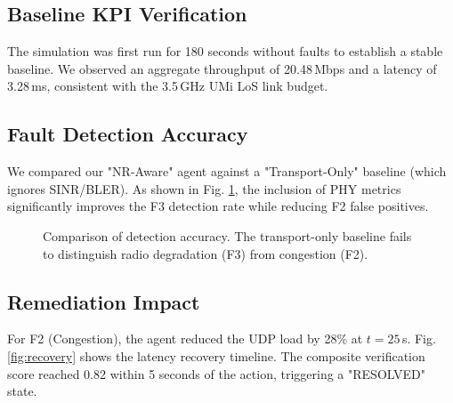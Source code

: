 \documentclass[journal]{IEEEtran}
\begin{document}
\subsection{Baseline KPI Verification}
The simulation was first run for 180 seconds without faults to establish a stable baseline. We observed an aggregate throughput of 20.48\,Mbps and a latency of 3.28\,ms, consistent with the 3.5\,GHz UMi LoS link budget.

\subsection{Fault Detection Accuracy}
We compared our "NR-Aware" agent against a "Transport-Only" baseline (which ignores SINR/BLER). As shown in Fig. \ref{fig:accuracy}, the inclusion of PHY metrics significantly improves the F3 detection rate while reducing F2 false positives.

\begin{figure}[htbp]
\centering
{}
\caption{Comparison of detection accuracy. The transport-only baseline fails to distinguish radio degradation (F3) from congestion (F2).}
\label{fig:accuracy}
\end{figure}

\subsection{Remediation Impact}
For F2 (Congestion), the agent reduced the UDP load by 28\% at $t=25$\,s. Fig. \ref{fig:recovery} shows the latency recovery timeline. The composite verification score reached 0.82 within 5 seconds of the action, triggering a "RESOLVED" state.
\end{document}
